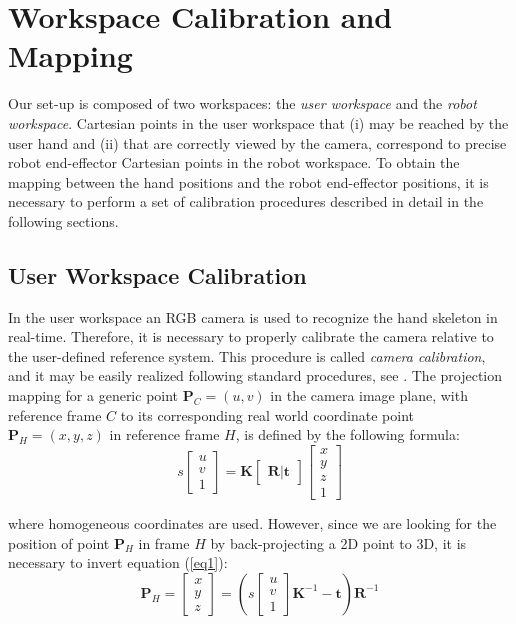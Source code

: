 \documentclass[a4paper, 10 pt, conference]{ieeeconf}      %
\begin{document}
\section{Workspace Calibration and Mapping} \label{sec:calib}

Our set-up is composed of two workspaces: the \textit{user workspace} and the \textit{robot workspace}. Cartesian points in the user workspace that (i) may be reached by the user hand and (ii) that are correctly viewed by the camera, correspond to precise robot end-effector Cartesian points in the robot workspace. To obtain the mapping between the hand positions and the robot end-effector positions, it is necessary to perform a set of calibration procedures described in detail in the following sections.

\subsection{User Workspace Calibration}
In the user workspace an RGB camera is used to recognize the hand skeleton in real-time. Therefore, it is necessary to properly calibrate the camera relative to the user-defined reference system. This procedure is called \textit{camera calibration}, and it may be easily realized following standard procedures, see \cite{CameraCalib}.
The projection mapping for a generic point $\mathbf{P}_{C} = (u,v)$ in the camera image plane, with reference frame $C$ to its corresponding real world coordinate point $\mathbf{P}_{H} = (x,y,z)$ in reference frame $H$, is defined by the following formula:
\begin{equation}
s 
\begin{bmatrix}
u \\
v \\
1
\end{bmatrix}
=
\mathbf{K}
\begin{bmatrix}
\mathbf{R} | \mathbf{t}
\end{bmatrix}
\begin{bmatrix}
x \\
y \\
z \\
1
\end{bmatrix}
\label{eq1}
\end{equation}

where homogeneous coordinates are used. However, since we are looking for the position of point $\mathbf{P}_H$ in frame $H$ by back-projecting a 2D point to 3D, it is necessary to invert equation (\ref{eq1}):
\begin{equation}
\mathbf{P}_{H} = \begin{bmatrix}
x \\
y \\
z
\end{bmatrix}=
\left(s 
\begin{bmatrix}
u \\
v \\
1
\end{bmatrix}
\mathbf{K}^{-1}-\mathbf{t}\right)\mathbf{R}^{-1}
\label{eq2}
\end{equation}
\end{document}
